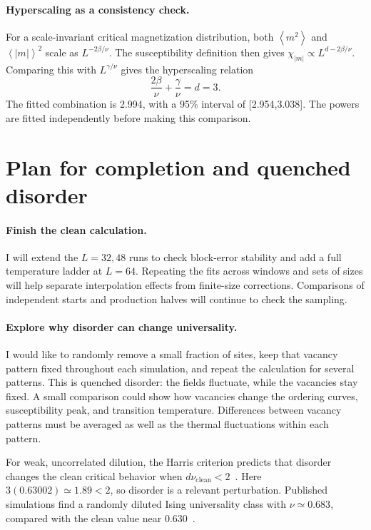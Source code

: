 \documentclass[11pt,letterpaper]{article}
\newcommand{\avg}[1]{\left\langle #1\right\rangle}
\newcommand{\chiabs}{\chi_{|m|}}
\begin{document}
\paragraph{Hyperscaling as a consistency check.}
For a scale-invariant critical magnetization distribution, both
$\avg{m^2}$ and $\avg{|m|}^2$ scale as $L^{-2\beta/\nu}$.
The susceptibility definition then gives
$\chiabs\propto L^{d-2\beta/\nu}$. Comparing this with
$L^{\gamma/\nu}$ gives the hyperscaling relation
\begin{equation}
 \frac{2\beta}{\nu}+\frac{\gamma}{\nu}=d=3.
\end{equation}
The fitted combination is 2.994, with a 95\% interval of [2.954,3.038].
The powers are fitted independently before making this comparison.

\newpage
\section{Plan for completion and quenched disorder}
\paragraph{Finish the clean calculation.}
I will extend the $L=32,48$ runs to check block-error stability and add a
full temperature ladder at $L=64$. Repeating the fits across windows and
sets of sizes will help separate interpolation effects from finite-size
corrections. Comparisons of independent starts and production halves
will continue to check the sampling.

\paragraph{Explore why disorder can change universality.}
I would like to randomly remove a small fraction of sites, keep that
vacancy pattern fixed throughout each simulation, and repeat the calculation
for several patterns. This is quenched disorder: the fields fluctuate,
while the vacancies stay fixed. A small comparison could show how
vacancies change the ordering curves, susceptibility peak, and transition
temperature. Differences between vacancy patterns must be averaged as
well as the thermal fluctuations within each pattern.

For weak, uncorrelated dilution, the Harris criterion predicts that
disorder changes the clean critical behavior when
$d\nu_{\mathrm{clean}}<2$~\cite{harris}. Here
$3(0.63002)\simeq1.89<2$, so disorder is a relevant perturbation.
Published simulations find a randomly diluted Ising universality class
with $\nu\simeq0.683$, compared with the clean value near
0.630~\cite{randomising}.
\end{document}
